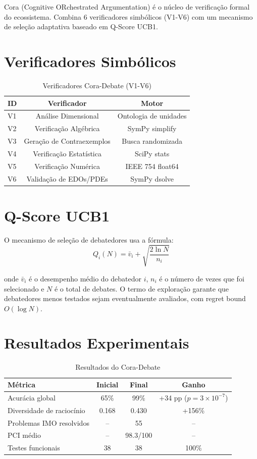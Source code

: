 \documentclass[12pt,a4paper,sumario=tradicional]{abntex2}
\begin{document}
Cora (Cognitive ORchestrated Argumentation) é o núcleo de verificação formal do ecossistema. Combina 6 verificadores simbólicos (V1-V6) com um mecanismo de seleção adaptativa baseado em Q-Score UCB1.

\section{Verificadores Simbólicos}

\begin{longtable}{@{}lcc@{}}
\caption{Verificadores Cora-Debate (V1-V6)}\\
\toprule
\textbf{ID} & \textbf{Verificador} & \textbf{Motor} \\
\midrule
V1 & Análise Dimensional & Ontologia de unidades \\
V2 & Verificação Algébrica & SymPy simplify \\
V3 & Geração de Contraexemplos & Busca randomizada \\
V4 & Verificação Estatística & SciPy stats \\
V5 & Verificação Numérica & IEEE 754 float64 \\
V6 & Validação de EDOs/PDEs & SymPy dsolve \\
\bottomrule
\end{longtable}

\section{Q-Score UCB1}

O mecanismo de seleção de debatedores usa a fórmula:
\begin{equation}
    Q_i(N) = \bar{v}_i + \sqrt{\frac{2\ln N}{n_i}}
\end{equation}

onde $\bar{v}_i$ é o desempenho médio do debatedor $i$, $n_i$ é o número de vezes que foi selecionado e $N$ é o total de debates. O termo de exploração garante que debatedores menos testados sejam eventualmente avaliados, com regret bound $O(\log N)$.

\section{Resultados Experimentais}

\begin{longtable}{@{}lccc@{}}
\caption{Resultados do Cora-Debate}\\
\toprule
\textbf{Métrica} & \textbf{Inicial} & \textbf{Final} & \textbf{Ganho} \\
\midrule
Acurácia global & 65\% & 99\% & +34 pp ($p=3\times10^{-7}$) \\
Diversidade de raciocínio & 0.168 & 0.430 & +156\% \\
Problemas IMO resolvidos & -- & 55 & -- \\
PCI médio & -- & 98.3/100 & -- \\
Testes funcionais & 38 & 38 & 100\% \\
\bottomrule
\end{longtable}
\end{document}
